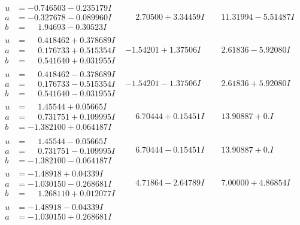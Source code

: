 \documentclass[1p]{elsarticle_modified}
\theoremstyle{definition}
\begin{document}
$$\begin{array}{c|c|c}
\begin{aligned}
u &= -0.746503 - 0.235179 I \\
a &= -0.327678 - 0.089960 I \\
b &= \phantom{-}1.94693 - 0.30523 I\end{aligned}
 & \phantom{-}2.70500 + 3.34459 I & \phantom{-}11.31994 - 5.51487 I \\ \hline\begin{aligned}
u &= \phantom{-}0.418462 + 0.378689 I \\
a &= \phantom{-}0.176733 + 0.515354 I \\
b &= \phantom{-}0.541640 + 0.031955 I\end{aligned}
 & -1.54201 + 1.37506 I & \phantom{-}2.61836 - 5.92080 I \\ \hline\begin{aligned}
u &= \phantom{-}0.418462 - 0.378689 I \\
a &= \phantom{-}0.176733 - 0.515354 I \\
b &= \phantom{-}0.541640 - 0.031955 I\end{aligned}
 & -1.54201 - 1.37506 I & \phantom{-}2.61836 + 5.92080 I \\ \hline\begin{aligned}
u &= \phantom{-}1.45544 + 0.05665 I \\
a &= \phantom{-}0.731751 + 0.109995 I \\
b &= -1.382100 + 0.064187 I\end{aligned}
 & \phantom{-}6.70444 + 0.15451 I & \phantom{-}13.90887 + 0. I\phantom{ +0.000000I} \\ \hline\begin{aligned}
u &= \phantom{-}1.45544 - 0.05665 I \\
a &= \phantom{-}0.731751 - 0.109995 I \\
b &= -1.382100 - 0.064187 I\end{aligned}
 & \phantom{-}6.70444 - 0.15451 I & \phantom{-}13.90887 + 0. I\phantom{ +0.000000I} \\ \hline\begin{aligned}
u &= -1.48918 + 0.04339 I \\
a &= -1.030150 - 0.268681 I \\
b &= \phantom{-}1.268110 + 0.012077 I\end{aligned}
 & \phantom{-}4.71864 - 2.64789 I & \phantom{-}7.00000 + 4.86854 I \\ \hline\begin{aligned}
u &= -1.48918 - 0.04339 I \\
a &= -1.030150 + 0.268681 I \\

\end{aligned}
\end{array}$$
\end{document}
